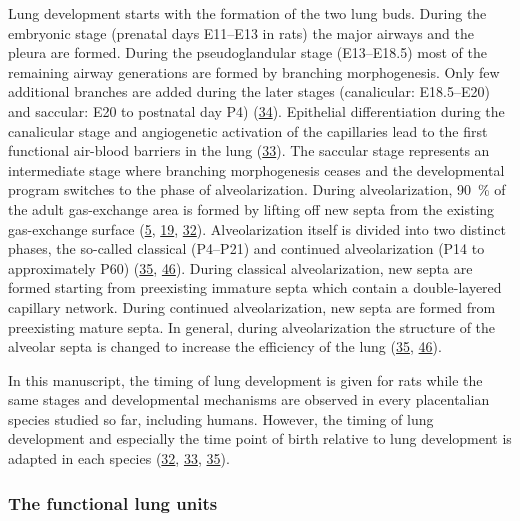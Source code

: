 \documentclass[
  american,
]{article}
\begin{document}
Lung development starts with the formation of the two lung buds.
During the embryonic stage (prenatal days E11--E13 in rats) the major airways and the pleura are formed.
During the pseudoglandular stage (E13--E18.5) most of the remaining airway generations are formed by branching morphogenesis.
Only few additional branches are added during the later stages (canalicular: E18.5--E20) and saccular: E20 to postnatal day P4) (\protect\hyperlink{ref-TsNwin2E}{34}).
Epithelial differentiation during the canalicular stage and angiogenetic activation of the capillaries lead to the first functional air-blood barriers in the lung (\protect\hyperlink{ref-ODQCVC23}{33}).
The saccular stage represents an intermediate stage where branching morphogenesis ceases and the developmental program switches to the phase of alveolarization.
During alveolarization, 90~\% of the adult gas-exchange area is formed by lifting off new septa from the existing gas-exchange surface (\protect\hyperlink{ref-auNiE56G}{5}, \protect\hyperlink{ref-1AhvLCPky}{19}, \protect\hyperlink{ref-XQLPrPTJ}{32}).
Alveolarization itself is divided into two distinct phases, the so-called classical (P4--P21) and continued alveolarization (P14 to approximately P60) (\protect\hyperlink{ref-d1YV8oOK}{35}, \protect\hyperlink{ref-wnl86DEM}{46}).
During classical alveolarization, new septa are formed starting from preexisting immature septa which contain a double-layered capillary network.
During continued alveolarization, new septa are formed from preexisting mature septa.
In general, during alveolarization the structure of the alveolar septa is changed to increase the efficiency of the lung (\protect\hyperlink{ref-d1YV8oOK}{35}, \protect\hyperlink{ref-wnl86DEM}{46}).

In this manuscript, the timing of lung development is given for rats while the same stages and developmental mechanisms are observed in every placentalian species studied so far, including humans.
However, the timing of lung development and especially the time point of birth relative to lung development is adapted in each species (\protect\hyperlink{ref-XQLPrPTJ}{32}, \protect\hyperlink{ref-ODQCVC23}{33}, \protect\hyperlink{ref-d1YV8oOK}{35}).

\hypertarget{the-functional-lung-units}{%
\subsubsection{The functional lung units}\label{the-functional-lung-units}}
\end{document}
